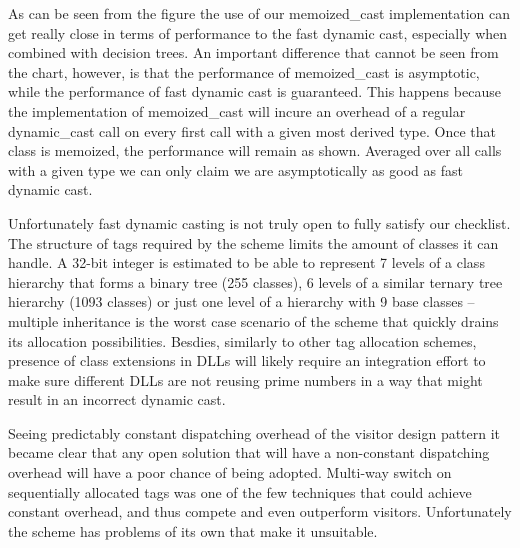 \documentclass[preprint]{sigplanconf}
\begin{document}
As can be seen from the figure the use of our memoized\_cast implementation can 
get really close in terms of performance to the fast dynamic cast, especially 
when combined with decision trees. An important difference that cannot be seen 
from the chart, however, is that the performance of memoized\_cast is 
asymptotic, while the performance of fast dynamic cast is guaranteed. This 
happens because the implementation of memoized\_cast will incure an overhead of 
a regular dynamic\_cast call on every first call with a given most derived type. 
Once that class is memoized, the performance will remain as shown. Averaged over 
all calls with a given type we can only claim we are asymptotically as good as 
fast dynamic cast.

Unfortunately fast dynamic casting is not truly open to fully satisfy our 
checklist. The structure of tags required by the scheme limits the amount of 
classes it can handle. A 32-bit integer is estimated to be able to represent 7 
levels of a class hierarchy that forms a binary tree (255 classes), 6 levels of 
a similar ternary tree hierarchy (1093 classes) or just one level of a hierarchy 
with 9 base classes -- multiple inheritance is the worst case scenario of the 
scheme that quickly drains its allocation possibilities. Besdies, similarly to 
other tag allocation schemes, presence of class extensions in DLLs will likely 
require an integration effort to make sure different DLLs are not reusing prime 
numbers in a way that might result in an incorrect dynamic cast.

Seeing predictably constant dispatching overhead of the visitor design pattern 
it became clear that any open solution that will have a non-constant dispatching 
overhead will have a poor chance of being adopted. Multi-way switch on 
sequentially allocated tags\cite{Spuler94} was one of the few techniques that 
could achieve constant overhead, and thus compete and even outperform visitors. 
Unfortunately the scheme has problems of its own that make it unsuitable.


\end{document}
